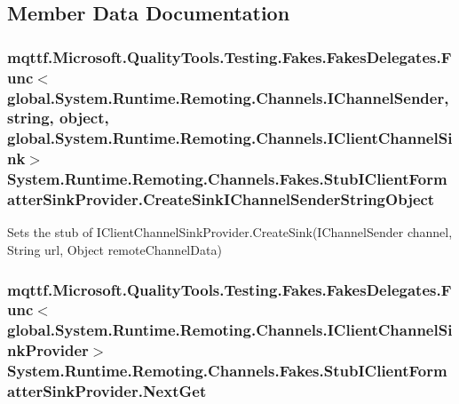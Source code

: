 \subsection{Member Data Documentation}
\hypertarget{class_system_1_1_runtime_1_1_remoting_1_1_channels_1_1_fakes_1_1_stub_i_client_formatter_sink_provider_abe467298e85c36de15e73966dddfd032}{
\subsubsection[{Create\-Sink\-I\-Channel\-Sender\-String\-Object}]{\setlength{\rightskip}{0pt plus 5cm}mqttf.\-Microsoft.\-Quality\-Tools.\-Testing.\-Fakes.\-Fakes\-Delegates.\-Func$<$global.\-System.\-Runtime.\-Remoting.\-Channels.\-I\-Channel\-Sender, string, object, global.\-System.\-Runtime.\-Remoting.\-Channels.\-I\-Client\-Channel\-Sink$>$ System.\-Runtime.\-Remoting.\-Channels.\-Fakes.\-Stub\-I\-Client\-Formatter\-Sink\-Provider.\-Create\-Sink\-I\-Channel\-Sender\-String\-Object}}\label{class_system_1_1_runtime_1_1_remoting_1_1_channels_1_1_fakes_1_1_stub_i_client_formatter_sink_provider_abe467298e85c36de15e73966dddfd032}


Sets the stub of I\-Client\-Channel\-Sink\-Provider.\-Create\-Sink(\-I\-Channel\-Sender channel, String url, Object remote\-Channel\-Data)

\hypertarget{class_system_1_1_runtime_1_1_remoting_1_1_channels_1_1_fakes_1_1_stub_i_client_formatter_sink_provider_a541485be01975569ec157b67229a9b9c}{
\subsubsection[{Next\-Get}]{\setlength{\rightskip}{0pt plus 5cm}mqttf.\-Microsoft.\-Quality\-Tools.\-Testing.\-Fakes.\-Fakes\-Delegates.\-Func$<$global.\-System.\-Runtime.\-Remoting.\-Channels.\-I\-Client\-Channel\-Sink\-Provider$>$ System.\-Runtime.\-Remoting.\-Channels.\-Fakes.\-Stub\-I\-Client\-Formatter\-Sink\-Provider.\-Next\-Get}}\label{class_system_1_1_runtime_1_1_remoting_1_1_channels_1_1_fakes_1_1_stub_i_client_formatter_sink_provider_a541485be01975569ec157b67229a9b9c}


